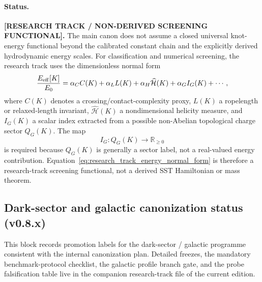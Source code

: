\documentclass[11pt]{article}
\theoremstyle{definition}
\theoremstyle{plain}
\theoremstyle{remark}
\begin{document}
        \paragraph{Status.}
        \textbf{[RESEARCH TRACK / NON-DERIVED SCREENING FUNCTIONAL].}
        The main canon does not assume a closed universal knot-energy functional beyond the calibrated constant chain and the explicitly derived hydrodynamic energy scales.  For classification and numerical screening, the research track uses the dimensionless normal form
        \begin{equation}
            \frac{E_{\rm eff}[K]}{E_0}
            =
            \alpha_C C(K)
            +\alpha_L L(K)
            +\alpha_H\widehat{\mathcal H}(K)
            +\alpha_G I_G(K)
            +\cdots,
            \label{eq:research_track_energy_normal_form}
        \end{equation}
        where $C(K)$ denotes a crossing/contact-complexity proxy, $L(K)$ a ropelength or relaxed-length invariant, $\widehat{\mathcal H}(K)$ a nondimensional helicity measure, and $I_G(K)$ a scalar index extracted from a possible non-Abelian topological charge sector $Q_G(K)$.  The map
        \begin{equation}
            I_G:Q_G(K)\longrightarrow \mathbb R_{\ge 0}
        \end{equation}
        is required because $Q_G(K)$ is generally a sector label, not a real-valued energy contribution.  Equation~\eqref{eq:research_track_energy_normal_form} is therefore a research-track screening functional, not a derived SST Hamiltonian or mass theorem.

    \subsection{Dark-sector and galactic canonization status (v0.8.x)}
        \label{sec:dark-canonicalization-status}

        This block records promotion labels for the dark-sector / galactic programme consistent with the internal canonization plan.  Detailed freezes, the mandatory benchmark-protocol checklist, the galactic profile branch gate, and the probe falsification table live in the companion research-track file of the current edition.
\end{document}
